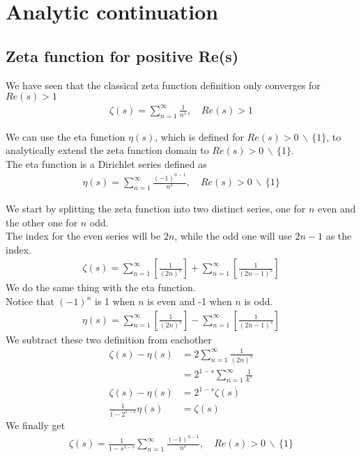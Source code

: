 \documentclass{article}
\newcommand{\exceptone}{
    \,\backslash\,\{1\}
}
\begin{document}
\pagebreak

\section{Analytic continuation}

\subsection{Zeta function for positive Re(s)}

We have seen that the classical zeta function definition only converges for $Re(s)>1$
\begin{align*}
    \zeta(s)=\sum_{n=1}^{\infty}\frac{1}{n^s},
    \quad Re(s)>1
\end{align*}

We can use the eta function $\eta(s)$, which is defined for $Re(s)>0\exceptone$, to analytically extend the zeta function domain to $Re(s)>0\exceptone$.
\\
The eta function is a Dirichlet series defined as
\begin{align*}
    \eta(s)=\sum_{n=1}^{\infty}\frac{(-1)^{n-1}}{n^s},
    \quad Re(s)>0\exceptone
\end{align*}

We start by splitting the zeta function into two distinct series, one for $n$ even and the other one for $n$ odd.
\\
The index for the even series will be $2n$, while the odd one will use $2n-1$ as the index.
\begin{align*}
    \zeta(s)=
    \sum_{n=1}^{\infty}\left[\frac{1}{(2n)^s}\right]+
    \sum_{n=1}^{\infty}\left[\frac{1}{(2n-1)^s}\right]
\end{align*}
We do the same thing with the eta function.
\\
Notice that $(-1)^n$ is 1 when $n$ is even and -1 when $n$ is odd.
\begin{align*}
    \eta(s)=
    \sum_{n=1}^{\infty}\left[\frac{1}{(2n)^s}\right]-
    \sum_{n=1}^{\infty}\left[\frac{1}{(2n-1)^s}\right]
\end{align*}
We subtract these two definition from eachother
\begin{align*}
    \zeta(s)-\eta(s)&=
    2\sum_{n=1}^{\infty}\frac{1}{(2n)^s}
    \\
    &=2^{1-s}\sum_{n=1}^{\infty}\frac{1}{k^s}
    \\
    \zeta(s)-\eta(s)&=2^{1-s}\zeta(s)
    \\
    \frac{1}{1-2^{1-s}}\eta(s)&=\zeta(s)
\end{align*}
We finally get
\begin{align*}
    \zeta(s)=\frac{1}{1-s^{1-s}}\sum_{n=1}^{\infty}\frac{(-1)^{n-1}}{n^s},
    \quad Re(s)>0\exceptone
\end{align*}
\end{document}
